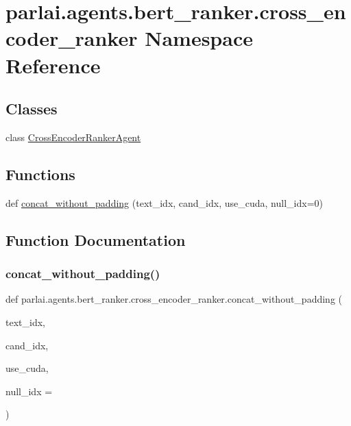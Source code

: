 \hypertarget{namespaceparlai_1_1agents_1_1bert__ranker_1_1cross__encoder__ranker}{}\section{parlai.\+agents.\+bert\+\_\+ranker.\+cross\+\_\+encoder\+\_\+ranker Namespace Reference}
\label{namespaceparlai_1_1agents_1_1bert__ranker_1_1cross__encoder__ranker}
\subsection*{Classes}
\begin{DoxyCompactItemize}
\item 
class \hyperlink{classparlai_1_1agents_1_1bert__ranker_1_1cross__encoder__ranker_1_1CrossEncoderRankerAgent}{Cross\+Encoder\+Ranker\+Agent}
\end{DoxyCompactItemize}
\subsection*{Functions}
\begin{DoxyCompactItemize}
\item 
def \hyperlink{namespaceparlai_1_1agents_1_1bert__ranker_1_1cross__encoder__ranker_a3914765cd62574f6f077c6e2e0070ab4}{concat\+\_\+without\+\_\+padding} (text\+\_\+idx, cand\+\_\+idx, use\+\_\+cuda, null\+\_\+idx=0)
\end{DoxyCompactItemize}


\subsection{Function Documentation}
\mbox{\label{namespaceparlai_1_1agents_1_1bert__ranker_1_1cross__encoder__ranker_a3914765cd62574f6f077c6e2e0070ab4}} 
\subsubsection{\texorpdfstring{concat\+\_\+without\+\_\+padding()}{concat\_without\_padding()}}
{\footnotesize\ttfamily def parlai.\+agents.\+bert\+\_\+ranker.\+cross\+\_\+encoder\+\_\+ranker.\+concat\+\_\+without\+\_\+padding (\begin{DoxyParamCaption}\item[{}]{text\+\_\+idx,  }\item[{}]{cand\+\_\+idx,  }\item[{}]{use\+\_\+cuda,  }\item[{}]{null\+\_\+idx = {} }\end{DoxyParamCaption})}

